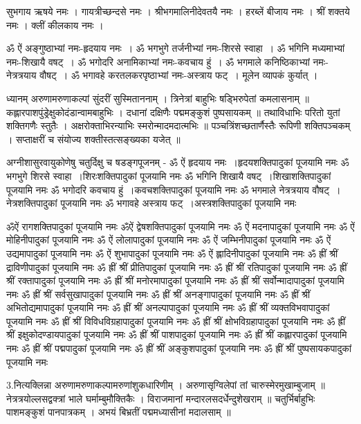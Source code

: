 सुभगाय ऋषये नमः । गायत्रीच्छन्दसे नमः । श्रीभगमालिनीदेवतयै नमः । हरब्लें बीजाय नमः । श्रीं शक्तये नमः । क्लीं कीलकाय नमः ।


ॐ ऐं अङ्गुष्ठाभ्यां नमः-हृदयाय नमः~। 
ॐ भगभुगे तर्जनीभ्यां नमः-शिरसे स्वाहा~।
ॐ भगिनि मध्यमाभ्यां नमः-शिखायै वषट्~।
ॐ भगोदरि अनामिकाभ्यां नमः-कवचाय हुं~।
ॐ भगमाले कनिष्ठिकाभ्यां नमः-नेत्रत्रयाय वौषट्~।
ॐ भगावहे करतलकरपृष्ठाभ्यां नमः-अस्त्राय फट्~।
मूलेन व्यापकं कुर्यात् ।

ध्यानम्
अरुणामरुणाकल्पां सुंदरीं सुस्मिताननाम् ।
त्रिनेत्रां बाहुभिः षड्भिरुपेतां कमलासनाम् ॥
कह्लारपाशपुंड्रेक्षुकोदंडान्वामबाहुभिः ।
दधानां दक्षिणैः पद्ममङ्कुशं पुष्पसायकम् ॥
तथाविधाभिः परितो युतां शक्तिगणैः स्तुतैः ।
अक्षरोक्ताभिरन्याभिः स्मरोन्मादमदात्मभिः ॥
पञ्चत्रिंशच्छतार्णैस्तैः रूपिणी शक्तिपञ्चकम् ।
सप्ताक्षरीं च संयोज्य शक्तीस्तत्सङ्ख्यका यजेत् ॥

अग्नीशासुरवायुकोणेषु चतुर्दिक्षु च षडङ्गपूजनम् -
ॐ ऐं हृदयाय नमः~।हृदयशक्तिपादुकां पूजयामि नमः
ॐ भगभुगे शिरसे स्वाहा~।शिरःशक्तिपादुकां पूजयामि नमः
ॐ भगिनि शिखायै वषट्~।शिखाशक्तिपादुकां पूजयामि नमः
ॐ भगोदरि कवचाय हुं~।कवचशक्तिपादुकां पूजयामि नमः
ॐ भगमाले नेत्रत्रयाय वौषट्~।नेत्रशक्तिपादुकां पूजयामि नमः
ॐ भगावहे अस्त्राय फट्~।अस्त्रशक्तिपादुकां पूजयामि नमः

ॐऐं रागशक्तिपादुकां पूजयामि नमः
ॐऐं द्वेषशक्तिपादुकां पूजयामि नमः
ॐ ऐं मदनापादुकां पूजयामि नमः
ॐ ऐं मोहिनीपादुकां पूजयामि नमः
ॐ ऐं लोलापादुकां पूजयामि नमः
ॐ ऐं जम्भिनीपादुकां पूजयामि नमः
ॐ ऐं उद्यमापादुकां पूजयामि नमः
ॐ ऐं शुभापादुकां पूजयामि नमः
ॐ ऐं ह्लादिनीपादुकां पूजयामि नमः
ॐ ह्रीं श्रीं द्राविणीपादुकां पूजयामि नमः
ॐ ह्रीं श्रीं प्रीतिपादुकां पूजयामि नमः
ॐ ह्रीं श्रीं रतिपादुकां पूजयामि नमः
ॐ ह्रीं श्रीं रक्तापादुकां पूजयामि नमः
ॐ ह्रीं श्रीं मनोरमापादुकां पूजयामि नमः
ॐ ह्रीं श्रीं सर्वोन्मादापादुकां पूजयामि नमः
ॐ ह्रीं श्रीं सर्वसुखापादुकां पूजयामि नमः
ॐ ह्रीं श्रीं अनङ्गापादुकां पूजयामि नमः
ॐ ह्रीं श्रीं अभितोद्यमापादुकां पूजयामि नमः
ॐ ह्रीं श्रीं अनल्पापादुकां पूजयामि नमः
ॐ ह्रीं श्रीं व्यक्तविभवापादुकां पूजयामि नमः
ॐ ह्रीं श्रीं विविधविग्रहापादुकां पूजयामि नमः
ॐ ह्रीं श्रीं क्षोभविग्रहापादुकां पूजयामि नमः
ॐ ह्रीं श्रीं इक्षुकोदण्डायपादुकां पूजयामि नमः
ॐ ह्रीं श्रीं पाशपादुकां पूजयामि नमः
ॐ ह्रीं श्रीं कह्लारपादुकां पूजयामि नमः
ॐ ह्रीं श्रीं पद्मपादुकां पूजयामि नमः
ॐ ह्रीं श्रीं अङ्कुशपादुकां पूजयामि नमः
ॐ ह्रीं श्रीं पुष्पसायकपादुकां पूजयामि नमः

3.नित्यक्लिन्ना 
अरुणामरुणाकल्पामरुणांशुकधारिणीम् । अरुणासृग्विलेपां तां चारुस्मेरमुखाम्बुजाम् ॥
नेत्रत्रयोल्लसद्वक्त्रां भाले घर्माम्बुमौक्तिकैः । विराजमानां मन्दारलसदर्धेन्दुशेखराम् ॥
चतुर्भिर्बाहुभिः पाशमङ्कुशं पानपात्रकम् । अभयं बिभ्रतीं पद्ममध्यासीनां मदालसाम् ॥

